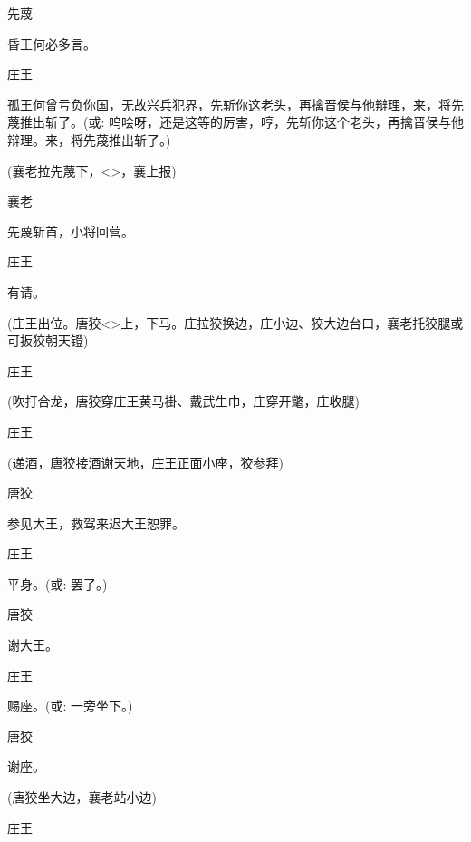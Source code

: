 {先蔑\hspace{30pt}~

昏王何必多言。

庄王

孤王何曾亏负你国，无故兴兵犯界，先斩你这老头，再擒晋侯与他辩理，来，将先蔑推出斩了。({\akai 或}: 呜哙呀，还是这等的厉害，哼，先斩你这个老头，再擒晋侯与他辩理。来，将先蔑推出斩了。)

(襄老拉先蔑下，\textless{}\!\textgreater{}，襄上报)

襄老\hspace{30pt}~

先蔑斩首，小将回营。

庄王\hspace{30pt}~

有请。

(庄王出位。唐狡\textless{}\!\textgreater{}上，下马。庄拉狡换边，庄小边、狡大边台口，襄老托狡腿或可扳狡朝天镫)

庄王


(吹打合龙，唐狡穿庄王黄马褂、戴武生巾，庄穿开氅，庄收腿)

庄王


(递酒，唐狡接酒谢天地，庄王正面小座，狡参拜)

唐狡\hspace{30pt}~

参见大王，救驾来迟大王恕罪。

庄王\hspace{30pt}~

平身。({\akai 或}: 罢了。)

唐狡\hspace{30pt}~

谢大王。

庄王\hspace{30pt}~

赐座。({\akai 或}: 一旁坐下。)

唐狡\hspace{30pt}~

谢座。

(唐狡坐大边，襄老站小边)

庄王\hspace{30pt}~

}
